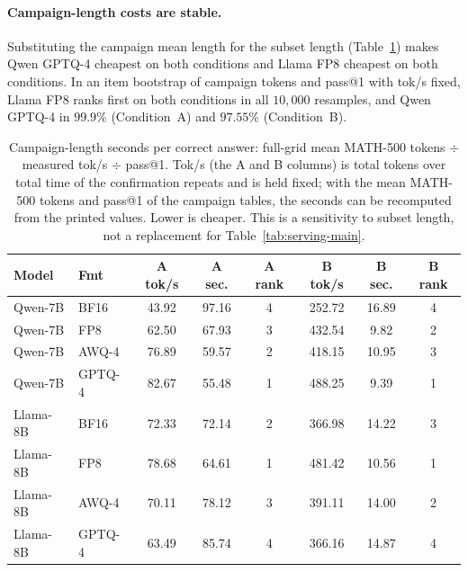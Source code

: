 \documentclass[11pt,a4paper]{article}
\begin{document}
\paragraph{Campaign-length costs are stable.} Substituting the campaign mean length for the subset length (Table~\ref{tab:length-cost}) makes Qwen GPTQ-4 cheapest on both conditions and Llama FP8 cheapest on both conditions. In an item bootstrap of campaign tokens and pass@1 with tok/s fixed, Llama FP8 ranks first on both conditions in all $10{,}000$ resamples, and Qwen GPTQ-4 in $99.9\%$ (Condition~A) and $97.55\%$ (Condition~B).

\begin{table}[t]
\centering
\caption{Campaign-length seconds per correct answer: full-grid mean MATH-500 tokens $\div$ measured tok/s $\div$ pass@1. Tok/s (the A and B columns) is total tokens over total time of the confirmation repeats and is held fixed; with the mean MATH-500 tokens and pass@1 of the campaign tables, the seconds can be recomputed from the printed values. Lower is cheaper. This is a sensitivity to subset length, not a replacement for Table~\ref{tab:serving-main}.}
\label{tab:length-cost}
\small
\begin{tabular}{llcccccc}
\toprule
\textbf{Model} & \textbf{Fmt} & \textbf{A tok/s} & \textbf{A sec.} & \textbf{A rank} & \textbf{B tok/s} & \textbf{B sec.} & \textbf{B rank} \\
\midrule
Qwen-7B & BF16 & 43.92 & 97.16 & 4 & 252.72 & 16.89 & 4 \\
Qwen-7B & FP8 & 62.50 & 67.93 & 3 & 432.54 & 9.82 & 2 \\
Qwen-7B & AWQ-4 & 76.89 & 59.57 & 2 & 418.15 & 10.95 & 3 \\
Qwen-7B & GPTQ-4 & 82.67 & 55.48 & 1 & 488.25 & 9.39 & 1 \\
Llama-8B & BF16 & 72.33 & 72.14 & 2 & 366.98 & 14.22 & 3 \\
Llama-8B & FP8 & 78.68 & 64.61 & 1 & 481.42 & 10.56 & 1 \\
Llama-8B & AWQ-4 & 70.11 & 78.12 & 3 & 391.11 & 14.00 & 2 \\
Llama-8B & GPTQ-4 & 63.49 & 85.74 & 4 & 366.16 & 14.87 & 4 \\
\bottomrule
\end{tabular}
\end{table}
\end{document}
